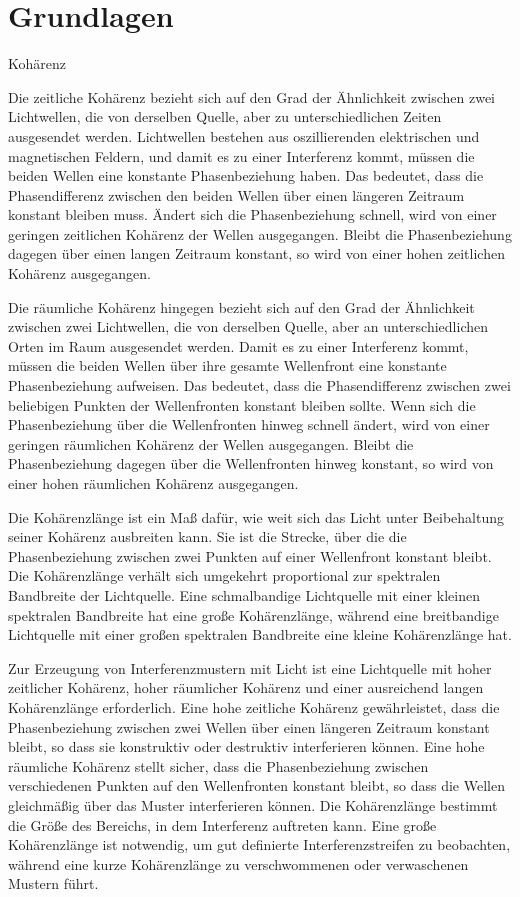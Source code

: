 \documentclass[12pt,english,ngerman]{scrartcl}
\begin{document}
\section{Grundlagen}\label{sec:Grund}


Kohärenz

Die zeitliche Kohärenz bezieht sich auf den Grad der Ähnlichkeit zwischen zwei
Lichtwellen, die von derselben Quelle, aber zu unterschiedlichen Zeiten
ausgesendet werden. Lichtwellen bestehen aus oszillierenden elektrischen und
magnetischen Feldern, und damit es zu einer Interferenz kommt, müssen die
beiden Wellen eine konstante Phasenbeziehung haben. Das bedeutet, dass die
Phasendifferenz zwischen den beiden Wellen über einen längeren Zeitraum
konstant bleiben muss. Ändert sich die Phasenbeziehung schnell, wird von einer
geringen zeitlichen Kohärenz der Wellen ausgegangen. Bleibt die Phasenbeziehung
dagegen über einen langen Zeitraum konstant, so wird von einer hohen zeitlichen
Kohärenz ausgegangen.

Die räumliche Kohärenz hingegen bezieht sich auf den Grad der Ähnlichkeit
zwischen zwei Lichtwellen, die von derselben Quelle, aber an unterschiedlichen
Orten im Raum ausgesendet werden. Damit es zu einer Interferenz kommt, müssen
die beiden Wellen über ihre gesamte Wellenfront eine konstante Phasenbeziehung
aufweisen. Das bedeutet, dass die Phasendifferenz zwischen zwei beliebigen
Punkten der Wellenfronten konstant bleiben sollte. Wenn sich die
Phasenbeziehung über die Wellenfronten hinweg schnell ändert, wird von einer
geringen räumlichen Kohärenz der Wellen ausgegangen. Bleibt die Phasenbeziehung
dagegen über die Wellenfronten hinweg konstant, so wird von einer hohen
räumlichen Kohärenz ausgegangen.

Die Kohärenzlänge ist ein Maß dafür, wie weit sich das Licht unter Beibehaltung
seiner Kohärenz ausbreiten kann. Sie ist die Strecke, über die die
Phasenbeziehung zwischen zwei Punkten auf einer Wellenfront konstant bleibt.
Die Kohärenzlänge verhält sich umgekehrt proportional zur spektralen Bandbreite
der Lichtquelle. Eine schmalbandige Lichtquelle mit einer kleinen spektralen
Bandbreite hat eine große Kohärenzlänge, während eine breitbandige Lichtquelle
mit einer großen spektralen Bandbreite eine kleine Kohärenzlänge hat.

Zur Erzeugung von Interferenzmustern mit Licht ist eine Lichtquelle mit hoher
zeitlicher Kohärenz, hoher räumlicher Kohärenz und einer ausreichend langen
Kohärenzlänge erforderlich. Eine hohe zeitliche Kohärenz gewährleistet, dass
die Phasenbeziehung zwischen zwei Wellen über einen längeren Zeitraum konstant
bleibt, so dass sie konstruktiv oder destruktiv interferieren können. Eine hohe
räumliche Kohärenz stellt sicher, dass die Phasenbeziehung zwischen
verschiedenen Punkten auf den Wellenfronten konstant bleibt, so dass die Wellen
gleichmäßig über das Muster interferieren können. Die Kohärenzlänge bestimmt
die Größe des Bereichs, in dem Interferenz auftreten kann. Eine große
Kohärenzlänge ist notwendig, um gut definierte Interferenzstreifen zu
beobachten, während eine kurze Kohärenzlänge zu verschwommenen oder
verwaschenen Mustern führt.
\end{document}
